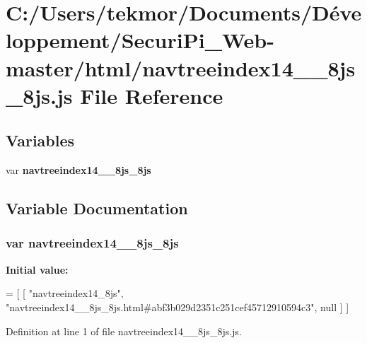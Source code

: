 \section{C\+:/\+Users/tekmor/\+Documents/\+Développement/\+Securi\+Pi\+\_\+\+Web-\/master/html/navtreeindex14\+\_\+\+\_\+8js\+\_\+8js.js File Reference}
\label{navtreeindex14____8js__8js_8js}
\subsection*{Variables}
\begin{DoxyCompactItemize}
\item 
var {\bf navtreeindex14\+\_\+\+\_\+8js\+\_\+8js}
\end{DoxyCompactItemize}


\subsection{Variable Documentation}
\subsubsection[{navtreeindex14\+\_\+\+\_\+8js\+\_\+8js}]{\setlength{\rightskip}{0pt plus 5cm}var navtreeindex14\+\_\+\+\_\+8js\+\_\+8js}\label{navtreeindex14____8js__8js_8js_ac751a29cfc04b4cb8f8bb879b6558629}
{\bfseries Initial value\+:}
\begin{DoxyCode}
=
[
    [ \textcolor{stringliteral}{"navtreeindex14\_8js"}, \textcolor{stringliteral}{"navtreeindex14\_\_8js\_8js.html#abf3b029d2351c251cef45712910594c3"}, null ]
]
\end{DoxyCode}


Definition at line 1 of file navtreeindex14\+\_\+\+\_\+8js\+\_\+8js.\+js.

